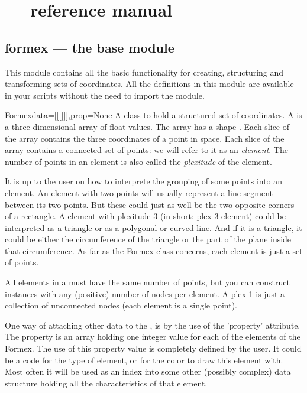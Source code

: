 
\chapter{\pyformex --- reference manual}
{\label{cha:reference}

\section{formex --- the base module}
{\label{sec:formex}

This module contains all the basic functionality for creating, structuring and transforming sets of coordinates. All the definitions in this module are available in your scripts without the need to import the module.

\begin{classdesc}{Formex}{data=[[[]]],prop=None}
A class to hold a structured set of coordinates. A  is a three dimensional array of float values. The array has a shape . Each slice \Code{[i,j]} of the array contains the three coordinates of a point in space. Each slice \Code{[i]} of the array contains a connected set of  points: we will refer to it as an \emph{element}. The number of points in an element is also called the \emph{plexitude} of the element.

It is up to the user on how to interprete the grouping of some points into an element. An element with two points  will usually represent a line segment between its two points. But these could just as well be the two opposite corners of a rectangle.
A element with plexitude 3 (in short: plex-3 element) could be interpreted as a triangle or as a polygonal or curved line. And if it is a triangle, it could be either the circumference of the triangle or the part of the plane inside that circumference. As far as the Formex class concerns, each element is just a set of points. 

All elements in a  must have the same number of points, but you can construct  instances with any (positive) number of nodes per element. A plex-1  is just a collection of unconnected nodes (each element is a single point).

One way of attaching other data to the , is by the use of the 'property' attribute. The property is an array holding one integer value for each of the elements of the Formex. The use of this property value is completely defined by the user. It could be a code for the type of element, or for the color to draw this element with. Most often it will be used as an index into some other (possibly complex) data structure holding all the characteristics of that element. 


\end{classdesc}}}
